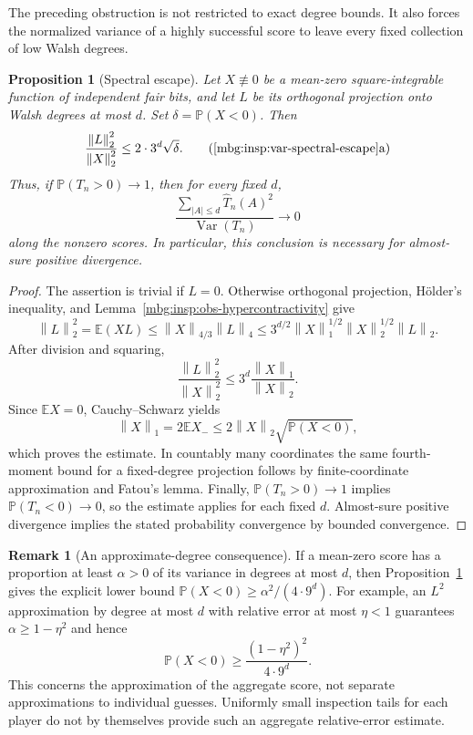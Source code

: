 \documentclass[11pt,letterpaper]{article}
\newtheorem{proposition}[theorem]{Proposition}
\theoremstyle{definition}
\newtheorem{remark}[theorem]{Remark}
\newcommand{\E}{\mathbb E}
\newcommand{\Prb}{\mathbb P}
\newcommand{\norm}[1]{\left\lVert #1\right\rVert}
\DeclareMathOperator{\Var}{Var}
\begin{document}
The preceding obstruction is not restricted to exact degree bounds.
It also forces the normalized variance of a highly successful score
to leave every fixed collection of low Walsh degrees.

\begin{proposition}[Spectral escape]
\label{mbg:insp:var-spectral-escape}
Let $X\not\equiv0$ be a mean-zero square-integrable function of
independent fair bits, and let $L$ be its orthogonal projection onto
Walsh degrees at most $d$.  Set $\delta=\Prb(X<0)$.  Then
\[
 \frac{\norm{L}_2^2}{\norm{X}_2^2}
 \le 2\cdot3^d\sqrt\delta.
 \tag{\ref{mbg:insp:var-spectral-escape}a}
\]
Thus, if $\Prb(T_n>0)\to1$, then for every fixed $d$,
\[
 \frac{\sum_{|A|\le d}\widehat T_n(A)^2}{\Var(T_n)}
 \longrightarrow0
\]
along the nonzero scores.  In particular, this conclusion is necessary
for almost-sure positive divergence.
\end{proposition}

\begin{proof}
The assertion is trivial if $L=0$.  Otherwise orthogonal projection,
H\"older's inequality, and Lemma~\ref{mbg:insp:obs-hypercontractivity} give
\[
 \norm{L}_2^2
 =\E(XL)
 \le\norm{X}_{4/3}\norm{L}_4
 \le3^{d/2}\norm{X}_1^{1/2}\norm{X}_2^{1/2}\norm{L}_2.
\]
After division and squaring,
\[
 \frac{\norm{L}_2^2}{\norm{X}_2^2}
 \le3^d\frac{\norm{X}_1}{\norm{X}_2}.
\]
Since $\E X=0$, Cauchy--Schwarz yields
\[
 \norm{X}_1=2\E X_-
 \le2\norm{X}_2\sqrt{\Prb(X<0)},
\]
which proves the estimate.  In countably many coordinates the same
fourth-moment bound for a fixed-degree projection follows by
finite-coordinate approximation and Fatou's lemma.  Finally,
$\Prb(T_n>0)\to1$ implies $\Prb(T_n<0)\to0$, so the estimate applies
for each fixed $d$.  Almost-sure positive divergence implies the
stated probability convergence by bounded convergence.
\end{proof}

\begin{remark}[An approximate-degree consequence]
\label{mbg:insp:var-approximate-degree}
If a mean-zero score has a proportion at least $\alpha>0$ of its
variance in degrees at most $d$, then
Proposition~\ref{mbg:insp:var-spectral-escape} gives the explicit lower bound
$\Prb(X<0)\ge\alpha^2/(4\cdot9^d)$.
For example, an $L^2$ approximation by degree at most $d$ with relative
error at most $\eta<1$ guarantees
$\alpha\ge1-\eta^2$ and hence
\[
 \Prb(X<0)\ge\frac{(1-\eta^2)^2}{4\cdot9^d}.
\]
This concerns the approximation of the aggregate score, not separate
approximations to individual guesses.  Uniformly small inspection
tails for each player do not by themselves provide such an aggregate
relative-error estimate.
\end{remark}
\end{document}
